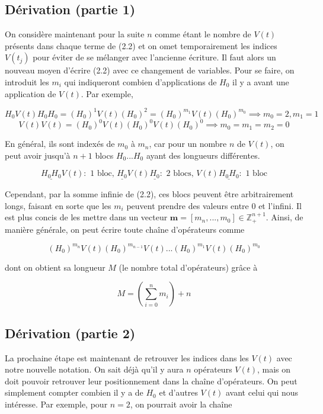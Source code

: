 \subsection{Dérivation (partie 1)}
On considère maintenant pour la suite $n$ comme étant le nombre de $V(t)$ présents dans chaque terme de (2.2) et on omet temporairement les indices $V(t_j)$ pour éviter de se mélanger avec l'ancienne écriture. Il faut alors un nouveau moyen d'écrire (2.2) avec ce changement de variables. Pour se faire, on introduit les $m_i$ qui indiqueront combien d'applications de $H_0$ il y a avant une application de $V(t)$. Par exemple,

\begin{equation*}
    H_0V(t)H_0H_0 = (H_0)^1V(t)(H_0)^2 = (H_0)^{m_1}V(t)(H_0)^{m_0} \implies m_0 = 2, m_1 = 1
\end{equation*}
\begin{equation*}
    V(t)V(t) = (H_0)^0V(t)(H_0)^0V(t)(H_0)^0 \implies m_0 = m_1 = m_2 = 0
\end{equation*}

En général, ils sont indexés de $m_0$ à $m_n$, car pour un nombre $n$ de $V(t)$, on peut avoir jusqu'à $n+1$ blocs $H_0...H_0$ ayant des longueurs différentes.

\begin{equation*}
    \underline{H_0H_0}V(t) : \text{ 1 bloc, } \underline{H_0}V(t)\underline{H_0} : \text{ 2 blocs, } V(t)\underline{H_0H_0} : \text{ 1 bloc}
\end{equation*}



Cependant, par la somme infinie de (2.2), ces blocs peuvent être arbitrairement longs, faisant en sorte que les $m_i$ peuvent prendre des valeurs entre 0 et l'infini. Il est plus concis de les mettre dans un vecteur $\boldsymbol{m} = \left[m_n, ..., m_0\right] \in \mathbb{Z}^{n+1}_+$. Ainsi, de manière générale, on peut écrire toute chaîne d'opérateurs comme 

\begin{equation}
    (H_0)^{m_n}V(t)(H_0)^{m_{n-1}}V(t)...(H_0)^{m_1}V(t)(H_0)^{m_0}
\end{equation}

dont on obtient sa longueur $M$ (le nombre total d'opérateurs) grâce à 

\begin{equation}
    M = \left(\sum_{i=0}^{n}m_i\right) + n
\end{equation}

\subsection{Dérivation (partie 2)}
La prochaine étape est maintenant de retrouver les indices dans les $V(t)$ avec notre nouvelle notation. On sait déjà qu'il y aura $n$ opérateurs $V(t)$, mais on doit pouvoir retrouver leur positionnement dans la chaîne d'opérateurs. On peut simplement compter combien il y a de $H_0$ et d'autres $V(t)$ avant celui qui nous intéresse. Par exemple, pour $n=2$, on pourrait avoir la chaîne

